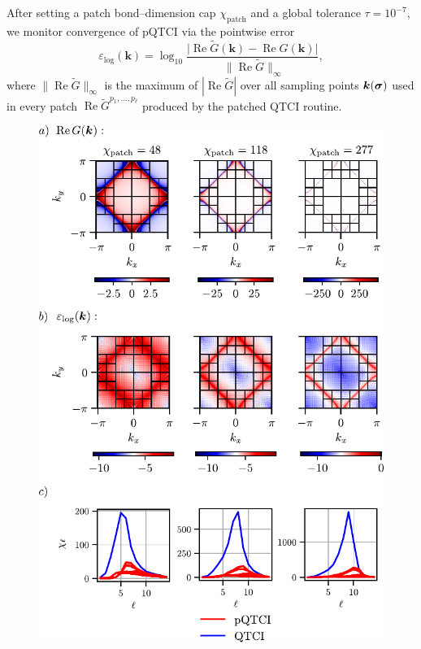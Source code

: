 After setting a patch bond–dimension cap \(\chi_{\text{patch}}\) and a global tolerance \(\tau=10^{-7}\), we monitor convergence of pQTCI via the pointwise error
\begin{equation}
  \varepsilon_{\text{log}}(\mathbf{k})
  = \log_{10}\!
      \frac{\bigl|\operatorname{Re}\widetilde G(\mathbf{k})
                -\operatorname{Re}G(\mathbf{k})\bigr|}
           {\;\|\operatorname{Re}\widetilde G\|_{\infty}},
  \label{eq:localError2DGreen}
\end{equation}
where \(\|\operatorname{Re}\widetilde G\|_{\infty}\) is the maximum of \(|\operatorname{Re}\widetilde G|\) over all sampling points \(\boldsymbol{k}(\boldsymbol{\sigma})\) used in every patch \(\operatorname{Re} \widetilde{G}^{p_1,\dots,p_{\bar\ell}}\) produced by the patched QTCI routine.

\begin{figure}[htbp]
    \centering 
    \includegraphics{figures/2DGreenErrorHeatmap.pdf}

\end{figure}
